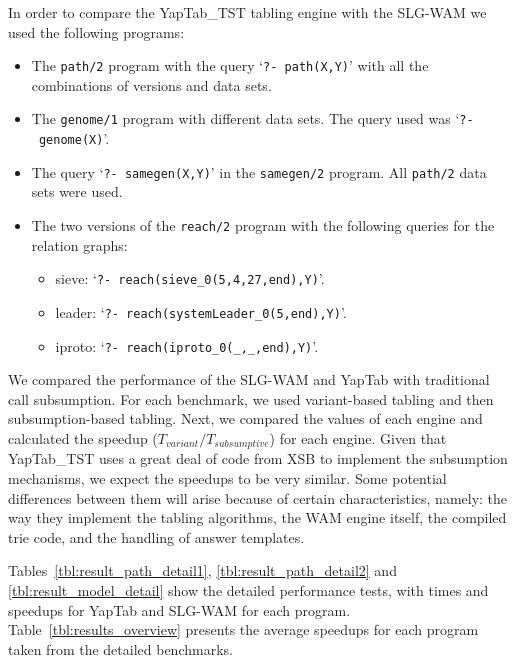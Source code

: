In order to compare the YapTab\_TST tabling engine with the SLG-WAM we used the following programs:

\begin{itemize}
   \item The \texttt{path/2} program with the query `\texttt{?-~path(X,Y)}' with all the combinations of
   versions and data sets.
   \item The \texttt{genome/1} program with different data sets. The query used was `\texttt{?-~genome(X)}'.
   
   \item The query `\texttt{?-~samegen(X,Y)}' in the \texttt{samegen/2} program. All \texttt{path/2} data
   sets were used.
   
   \item The two versions of the \texttt{reach/2} program with the following queries for the relation graphs:

   \begin{itemize}
      \item sieve: `\texttt{?-~reach(sieve\_0(5,4,27,end),Y)}'.
      \item leader: `\texttt{?-~reach(systemLeader\_0(5,end),Y)}'.
      \item iproto: `\texttt{?-~reach(iproto\_0(\_,\_,end),Y)}'.
   \end{itemize}

\end{itemize}

We compared the performance of the SLG-WAM and YapTab with traditional call subsumption.
For each benchmark, we used variant-based tabling and then subsumption-based tabling.
Next, we compared the values of each engine and calculated the speedup ($T_{variant} / T_{subsumptive}$) for
each engine. Given that YapTab\_TST uses a great deal of code from XSB to implement the subsumption mechanisms,
we expect the speedups to be very similar. Some potential differences between them will arise because
of certain characteristics, namely: the way they implement the tabling algorithms, the WAM engine itself,
the compiled trie code, and the handling of answer templates.

Tables~\ref{tbl:result_path_detail1}, \ref{tbl:result_path_detail2} and \ref{tbl:result_model_detail}
show the detailed performance tests, with times and speedups for YapTab and SLG-WAM for each program.
Table~\ref{tbl:results_overview} presents the average speedups for each program taken from the
detailed benchmarks.

